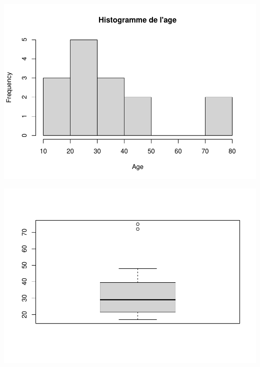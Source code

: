 \documentclass[
]{book}
\newenvironment{Shaded}{\begin{snugshade}}{\end{snugshade}}
\newcommand{\FunctionTok}[1]{\textcolor[rgb]{0.13,0.29,0.53}{\textbf{#1}}}
\newcommand{\NormalTok}[1]{#1}
\newcommand{\SpecialCharTok}[1]{\textcolor[rgb]{0.81,0.36,0.00}{\textbf{#1}}}
\begin{document}
\includegraphics{_main_files/figure-latex/unnamed-chunk-52-1.pdf}

\begin{Shaded}
\end{Shaded}

\includegraphics{_main_files/figure-latex/unnamed-chunk-52-2.pdf}

  
\end{document}
